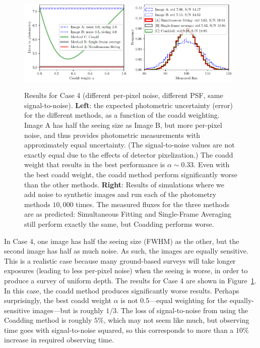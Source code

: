 \documentclass[letter,11pt]{article}
\begin{document}
\begin{figure}[b!]
  \begin{center}
    \includegraphics[width=0.48\textwidth]{coadd-06}
    \includegraphics[width=0.48\textwidth]{coadd-07}
  \end{center}
  \caption{Results for Case 4 (different per-pixel noise, different
    PSF, same signal-to-noise).  \textbf{Left}: the expected
    photometric uncertainty (error) for the different methods, as a
    function of the coadd weighting.  Image A has half the seeing size
    as Image B, but more per-pixel noise, and thus provides
    photometric measurements with approximately equal uncertainty.
    (The signal-to-noise values are not exactly equal due to the
    effects of detector pixelization.)  The coadd weight that results
    in the best performance is $\alpha \sim 0.33$.  Even with the best
    coadd weight, the coadd method perform significantly worse than the
    other methods.
    \newline \textbf{Right}: Results of simulations where we add noise
    to synthetic images and run each of the photometry methods
    $10,000$ times.  The measured fluxes for the three methods are as
    predicted: Simultaneous Fitting and Single-Frame Averaging
    still perform exactly the same, but Coadding performs worse.
    \label{fig:casefour}}
\end{figure}

In Case 4, one image has half the seeing size (FWHM) as the other, but
the second image has half as much noise.  As such, the images are
equally sensitive.  This is a realistic case because many ground-based
surveys will take longer exposures (leading to less per-pixel noise)
when the seeing is worse, in order to produce a survey of uniform
depth.  The results for Case 4 are shown in Figure~\ref{fig:casefour}.
In this case, the coadd method produces significantly worse results.
Perhaps surprisingly, the best coadd weight $\alpha$ is not
$0.5$---equal weighting for the equally-sensitive images---but is
roughly $1/3$.  The loss of signal-to-noise from using the Coadding
method is roughly $5\%$, which may not seem like much, but observing
time goes with signal-to-noise squared, so this corresponds to more
than a $10\%$ increase in required observing time.
\end{document}
